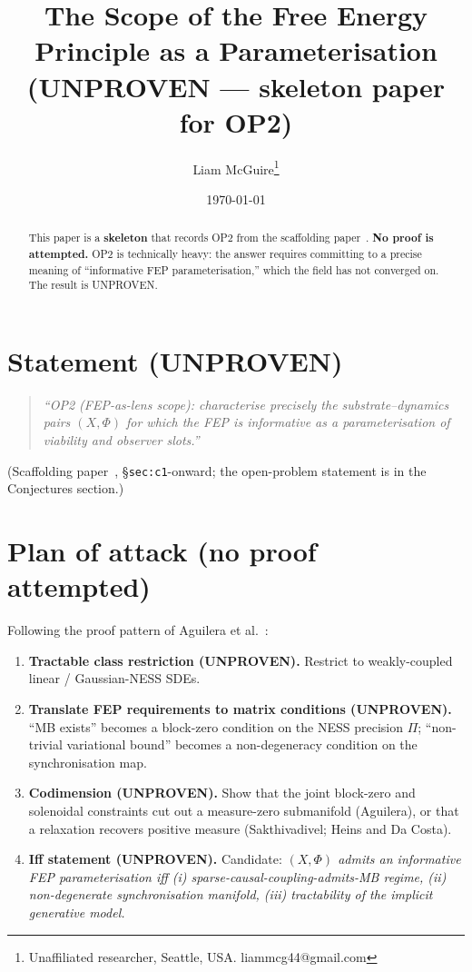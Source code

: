 \documentclass[11pt]{article}
\title{The Scope of the Free Energy Principle as a Parameterisation \\
       \large (UNPROVEN --- skeleton paper for OP2)}
\author{Liam McGuire\thanks{Unaffiliated researcher, Seattle, USA. liammcg44@gmail.com}}
\date{\today}
\theoremstyle{plain}
\theoremstyle{definition}
\begin{document}
\maketitle

\begin{abstract}
This paper is a \textbf{skeleton} that records OP2 from the
scaffolding paper~\cite{emergent_systems_2026}. \textbf{No proof is
attempted.} OP2 is technically heavy: the answer requires committing
to a precise meaning of ``informative FEP parameterisation,'' which
the field has not converged on. The result is UNPROVEN.
\end{abstract}

\section{Statement (UNPROVEN)}

\begin{quote}
\emph{``OP2 (FEP-as-lens scope): characterise precisely the
substrate--dynamics pairs $(X, \Phi)$ for which the FEP is
informative as a parameterisation of viability and observer slots.''}
\end{quote}
\noindent (Scaffolding paper~\cite{emergent_systems_2026},
\S\texttt{sec:c1}-onward; the open-problem statement is in the
Conjectures section.)

\section{Plan of attack (no proof attempted)}

Following the proof pattern of Aguilera et
al.~\cite{aguilera2022particular}:

\begin{enumerate}[leftmargin=2em,itemsep=4pt]
  \item \textbf{Tractable class restriction (UNPROVEN).} Restrict to
    weakly-coupled linear / Gaussian-NESS SDEs.
  \item \textbf{Translate FEP requirements to matrix conditions
    (UNPROVEN).} ``MB exists'' becomes a block-zero condition on the
    NESS precision $\Pi$; ``non-trivial variational bound'' becomes
    a non-degeneracy condition on the synchronisation map.
  \item \textbf{Codimension (UNPROVEN).} Show that the joint
    block-zero and solenoidal constraints cut out a measure-zero
    submanifold (Aguilera), or that a relaxation recovers positive
    measure (Sakthivadivel; Heins and Da Costa).
  \item \textbf{Iff statement (UNPROVEN).} Candidate:
    \emph{$(X, \Phi)$ admits an informative FEP parameterisation iff
    (i) sparse-causal-coupling-admits-MB regime, (ii) non-degenerate
    synchronisation manifold, (iii) tractability of the implicit
    generative model.}
\end{enumerate}
\end{document}
